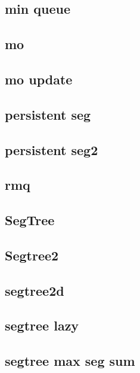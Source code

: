 \subsection{min queue}
\raggedbottom
\hrulefill
\subsection{mo}
\raggedbottom
\hrulefill
\subsection{mo update}
\raggedbottom
\hrulefill
\subsection{persistent seg}
\raggedbottom
\hrulefill
\subsection{persistent seg2}
\raggedbottom
\hrulefill
\subsection{rmq}
\raggedbottom
\hrulefill
\subsection{SegTree}
\raggedbottom
\hrulefill
\subsection{Segtree2}
\raggedbottom
\hrulefill
\subsection{segtree2d}
\raggedbottom
\hrulefill
\subsection{segtree lazy}
\raggedbottom
\hrulefill
\subsection{segtree max seg sum}
\raggedbottom
\hrulefill
